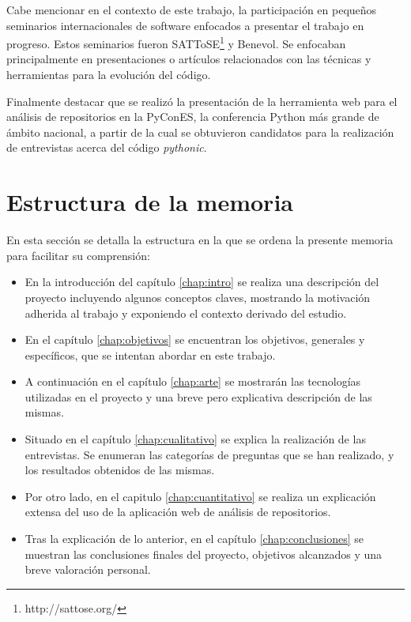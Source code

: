 \documentclass[a4paper, 12pt]{book}
\begin{document}
Cabe mencionar en el contexto de este trabajo, la participación en pequeños seminarios internacionales de software enfocados a presentar el trabajo en progreso. Estos seminarios fueron SATToSE\footnote{http://sattose.org/} y Benevol. Se enfocaban principalmente en presentaciones o artículos relacionados con las técnicas y herramientas para la evolución del código.

Finalmente destacar que se realizó la presentación de la herramienta web para el análisis de repositorios en la PyConES, la conferencia Python más grande de ámbito nacional, a partir de la cual se obtuvieron candidatos para la realización de entrevistas acerca del código \textit{pythonic}.

\section{Estructura de la memoria}
\label{sec:Estructura}
En esta sección se detalla la estructura en la que se ordena la presente memoria para facilitar su comprensión:
\begin{itemize}

    \item En la introducción del capítulo \ref{chap:intro} se realiza una descripción del proyecto incluyendo algunos conceptos claves, mostrando la motivación adherida al trabajo y exponiendo el contexto derivado del estudio.

    \item En el capítulo \ref{chap:objetivos} se encuentran los objetivos, generales y específicos, que se intentan abordar en este trabajo.

    \item A continuación en el capítulo \ref{chap:arte} se mostrarán las tecnologías utilizadas en el proyecto y una breve pero explicativa descripción de las mismas.

    \item Situado en el capítulo \ref{chap:cualitativo} se explica la realización de las entrevistas. Se enumeran las categorías de preguntas que se han realizado, y los resultados obtenidos de las mismas.

    \item Por otro lado, en el capitulo \ref{chap:cuantitativo} se realiza un explicación extensa del uso de la aplicación web de análisis de repositorios.
    
    \item Tras la explicación de lo anterior, en el capítulo \ref{chap:conclusiones} se muestran las conclusiones finales del proyecto, objetivos alcanzados y una breve valoración personal.
    
\end{itemize}
\end{document}
